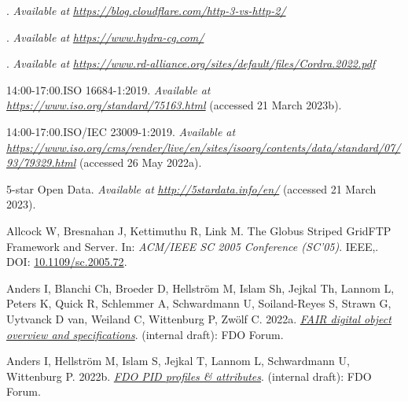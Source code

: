 \hypertarget{refs}{}
\begin{CSLReferences}{1}{0}
\leavevmode{}%
. \emph{Available at} \href{https://blog.cloudflare.com/http-3-vs-http-2/}{\emph{https://blog.cloudflare.com/http-3-vs-http-2/}}

\leavevmode{}%
. \emph{Available at} \href{https://www.hydra-cg.com/}{\emph{https://www.hydra-cg.com/}}

\leavevmode{}%
. \emph{Available at} \href{https://www.rd-alliance.org/sites/default/files/Cordra.2022.pdf}{\emph{https://www.rd-alliance.org/sites/default/files/Cordra.2022.pdf}}

\leavevmode{}%
14:00-17:00.ISO 16684-1:2019. \emph{Available at} \href{https://www.iso.org/standard/75163.html}{\emph{https://www.iso.org/standard/75163.html}} (accessed 21 March 2023b).

\leavevmode{}%
14:00-17:00.ISO/IEC 23009-1:2019. \emph{Available at} \href{https://www.iso.org/cms/render/live/en/sites/isoorg/contents/data/standard/07/93/79329.html}{\emph{https://www.iso.org/cms/render/live/en/sites/isoorg/contents/data/standard/07/93/79329.html}} (accessed 26 May 2022a).

\leavevmode{}%
5-star Open Data. \emph{Available at} \href{http://5stardata.info/en/}{\emph{http://5stardata.info/en/}} (accessed 21 March 2023).

\leavevmode{}%
Allcock W, Bresnahan J, Kettimuthu R, Link M. The Globus Striped GridFTP Framework and Server. In: \emph{ACM/IEEE SC 2005 Conference (SC'05)}. IEEE,. DOI: \href{https://doi.org/10.1109/sc.2005.72}{10.1109/sc.2005.72}.

\leavevmode{}%
Anders I, Blanchi Ch, Broeder D, Hellström M, Islam Sh, Jejkal Th, Lannom L, Peters K, Quick R, Schlemmer A, Schwardmann U, Soiland-Reyes S, Strawn G, Uytvanck D van, Weiland C, Wittenburg P, Zwölf C. 2022a. \emph{\href{https://docs.google.com/document/d/1GAj-1owAAPDF7hVis2dYPPCOHiPHrIXIo4j-S5AdEFI/edit}{FAIR digital object overview and specifications}}. (internal draft): FDO Forum.

\leavevmode{}%
Anders I, Hellström M, Islam S, Jejkal T, Lannom L, Schwardmann U, Wittenburg P. 2022b. \emph{\href{https://docs.google.com/document/d/1c2mZziq5pIPmLxMHLcYqlWrjYsc2ezGMXvp0E46iljo/edit}{FDO PID profiles \& attributes}}. (internal draft): FDO Forum.


\end{CSLReferences}
